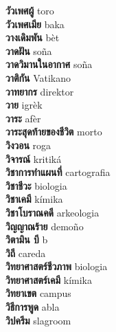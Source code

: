 \textbf{ วัวเพศผู้  } toro \\
\textbf{ วัวเพศเมีย  } baka \\
\textbf{ วางเดิมพัน  } bèt \\
\textbf{ วาดฝัน  } soña \\
\textbf{ วาดวิมานในอากาศ  } soña \\
\textbf{ วาติกัน  } Vatikano \\
\textbf{ วาทยากร  } direktor \\
\textbf{ วาย  } igrèk \\
\textbf{ วาระ  } afèr \\
\textbf{ วาระสุดท้ายของชีวิต  } morto \\
\textbf{ วิงวอน  } roga \\
\textbf{ วิจารณ์  } kritiká \\
\textbf{ วิชาการทำแผนที่  } cartografia \\
\textbf{ วิชาชีวะ  } biologia \\
\textbf{ วิชาเคมี  } kímika \\
\textbf{ วิชาโบราณคดี  } arkeologia \\
\textbf{ วิญญาณร้าย  } demoño \\
\textbf{ วิตามิน บี  } b \\
\textbf{ วิถี  } careda \\
\textbf{ วิทยาศาสตร์ชีวภาพ  } biologia \\
\textbf{ วิทยาศาสตร์เคมี  } kímika \\
\textbf{ วิทยาเขต  } campus \\
\textbf{ วิธีการพูด  } abla \\
\textbf{ วิปครีม  } slagroom \\
